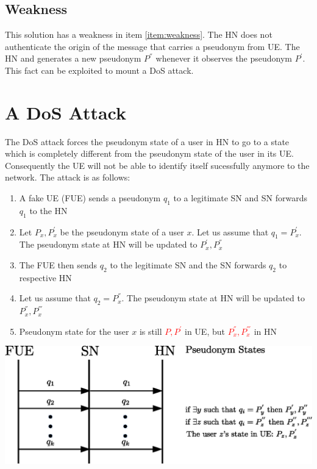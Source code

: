 \documentclass[portrait,a0]{a0poster}
\begin{document}
\begin{multicols}{2}
\subsection*{Weakness}This solution has a weakness in item \ref{item:weakness}. The HN does not authenticate the origin of the message that carries a pseudonym from UE.  The HN and generates a new pseudonym $P^{''}$ whenever it observes the pseudonym $P^{'}$. This fact can be exploited to mount a DoS attack.

\section{A D\MakeLowercase{o}S Attack}
The DoS attack forces the pseudonym state of a user in HN to go to a state which is completely different from the pseudonym state of the user in its UE. Consequently the UE will not be able to identify itself sucessfully anymore to the network. The attack is as follows:
\begin{enumerate}
\item \label{send_fake_pseudonym} A fake UE (FUE) sends a pseudonym $q_1$ to a legitimate SN and SN forwards $q_1$ to the HN
\item \label{q_equal_pseudonym} Let $P_x,P_x^{'}$ be the pseudonym state of a user $x$. Let us assume that $q_1=P_x^{'}$. The pseudonym state at HN will be updated to $P_x^{'},P_x^{''}$
\item The FUE then sends $q_2$ to the legitimate SN and the SN forwards $q_2$ to respective HN
\item Let us assume that $q_2=P_x^{''}$. The pseudonym state at HN will be updated to $P_x^{''},P_x^{'''}$
\item Pseudonym state for the user $x$ is still \textcolor{red}{$P,P^{'}$} in UE, but \textcolor{red}{$P_x^{''},P_x^{'''}$} in HN
\end{enumerate}

\begin{center}
\begin{minipage}[t]{0.9\linewidth} %
\vspace{.25cm} %
\includegraphics[width=1\linewidth]{attack.eps}
\hspace{0pt}
\vspace{.25cm} %
\end{minipage} 
\end{center}


\end{multicols}
\end{document}
